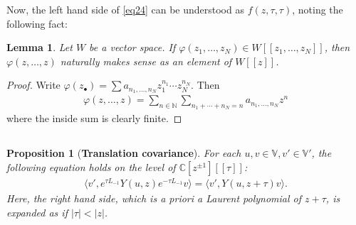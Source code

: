 \documentclass[11pt,b5paper,notitlepage]{article}
\theoremstyle{definition}
\theoremstyle{plain}
\newtheorem{pp}[df]{Proposition}
\newtheorem{lm}[df]{Lemma}
\newcommand{\bigbk}[1]{\big\langle {#1}\big\rangle}
\newcommand{\blt}{\bullet}
\newcommand{\Vbb}{\mathbb V}
\newcommand{\Cbb}{\mathbb C}
\newcommand{\Nbb}{\mathbb N}
\numberwithin{equation}{section}
\begin{document}
Now, the left hand side of \eqref{eq24} can be understood as $f(z,\tau,\tau)$, noting the following fact:
\begin{lm}
Let $W$ be a vector space. If $\varphi(z_1,\dots,z_N)\in W[[z_1,\dots,z_N]]$, then $\varphi(z,\dots,z)$ naturally makes sense as an element of $W[[z]]$.
\end{lm}
\begin{proof}
Write $\varphi(z_\blt)=\sum a_{n_1,\dots,n_N}z_1^{n_1}\cdots z_N^{n_N}$. Then
\begin{align*}
\varphi(z,\dots,z)=\sum_{n\in\Nbb} \sum_{n_1+\cdots+n_N=n}a_{n_1,\dots,n_N} z^n
\end{align*}
where the inside sum is clearly finite.
\end{proof}




\subsection{}





\begin{pp}[\textbf{Translation covariance}]\label{lb22}
For each $u,v\in\Vbb,v'\in\Vbb'$, the following equation holds on the level of $\Cbb[z^{\pm1}][[\tau]]$:
\begin{align}
\bigbk{v',e^{\tau L_{-1}}Y(u,z)e^{-\tau L_{-1}}v}=\bigbk{v',Y(u,z+\tau)v}.\label{eq26}	
\end{align}
Here, the right hand side, which is a priori a Laurent polynomial of $z+\tau$, is expanded as if $|\tau|<|z|$.
\end{pp}	
\end{document}

